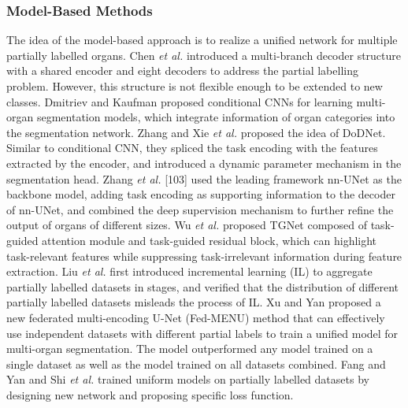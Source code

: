 \documentclass[lettersize,journal]{IEEEtran}
\begin{document}
\subsubsection{Model-Based Methods}
The idea of the model-based approach is to realize a unified network for multiple partially labelled organs. Chen {\it{et al.}} \cite{188} introduced a multi-branch decoder structure with a shared encoder and eight decoders to address the partial labelling problem. However, this structure is not flexible enough to be extended to new classes. Dmitriev and Kaufman \cite{189} proposed conditional CNNs for learning multi-organ segmentation models, which integrate information of organ categories into the segmentation network. Zhang and Xie {\it{et al.}} \cite{190,191} proposed the idea of DoDNet. Similar to conditional CNN, they spliced the task encoding with the features extracted by the encoder, and introduced a dynamic parameter mechanism in the segmentation head. Zhang {\it{et al.}} [103] used the leading framework nn-UNet \cite{101} as the backbone model, adding task encoding as supporting information to the decoder of nn-UNet, and combined the deep supervision mechanism to further refine the output of organs of different sizes. Wu {\it{et al.}} \cite{192} proposed TGNet composed of task-guided attention module and task-guided residual block, which can highlight task-relevant features while suppressing task-irrelevant information during feature extraction. Liu {\it{et al.}} \cite{193} first introduced incremental learning (IL) to aggregate partially labelled datasets in stages, and verified that the distribution of different partially labelled datasets misleads the process of IL. Xu and Yan \cite{194} proposed a new federated multi-encoding U-Net (Fed-MENU) method that can effectively use independent datasets with different partial labels to train a unified model for multi-organ segmentation. The model outperformed any model trained on a single dataset as well as the model trained on all datasets combined. Fang and Yan \cite{195} and Shi {\it{et al.}} \cite{196} trained uniform models on partially labelled datasets by designing new network and proposing specific loss function.
\end{document}
